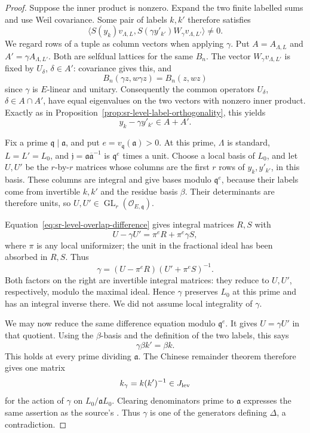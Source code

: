 \begin{proof}
Suppose the inner product is nonzero.
Expand the two finite labelled sums and use Weil covariance.
Some pair of labels \(k,k'\) therefore satisfies
\[
 \langle S(y_k)v_{\Lambda,L},
              S(\gamma y'_{k'})W_\gamma v_{\Lambda,L'}\rangle
                                                        \ne0 .
\]
We regard rows of a tuple as column vectors when applying
\(\gamma\).
Put \(A=A_{\Lambda,L}\) and \(A'=\gamma A_{\Lambda,L'}\).
Both are selfdual lattices for the same \(B_n\).
The vector \(W_\gamma v_{\Lambda,L'}\) is fixed by
\(U_\delta\), \(\delta\in A'\): covariance gives this, and
\[
 B_n(\gamma z,w\gamma z)=B_n(z,wz)
\]
since \(\gamma\) is \(E\)-linear and unitary.
Consequently the common operators \(U_\delta\),
\(\delta\in A\cap A'\), have equal eigenvalues on the two
vectors with nonzero inner product.
Exactly as in
Proposition~\ref{prop:sr-level-label-orthogonality}, this yields
\begin{equation}\label{eq:sr-level-overlap-difference}
              y_k-\gamma y'_{k'}\in A+A'.
\end{equation}

Fix a prime \(\mathfrak q\mid\mathfrak a\), and put
\(e=v_{\mathfrak q}(\mathfrak a)>0\).
At this prime, \(\Lambda\) is standard,
\(L=L'=L_0\), and
\(\mathfrak j=\mathfrak a\overline{\mathfrak a}^{-1}\)
is \(\mathfrak q^e\) times a unit.
Choose a local basis of \(L_0\), and let \(U,U'\) be the
\(r\)-by-\(r\) matrices whose columns are the first \(r\)
rows of \(y_k,y'_{k'}\), in this basis.
These columns are integral and give bases modulo
\(\mathfrak q^e\), because their labels come from invertible
\(k,k'\) and the residue basis \(\beta\).
Their determinants are therefore units, so
\(U,U'\in\operatorname{GL}_r(\mathcal O_{E,\mathfrak q})\).

Equation~\eqref{eq:sr-level-overlap-difference} gives integral
matrices \(R,S\) with
\[
                 U-\gamma U'=\pi^e R+\pi^e\gamma S ,
\]
where \(\pi\) is any local uniformizer; the unit in the
fractional ideal has been absorbed in \(R,S\).
Thus
\[
       \gamma=(U-\pi^eR)(U'+\pi^eS)^{-1}.
\]
Both factors on the right are invertible integral matrices:
they reduce to \(U,U'\), respectively, modulo the maximal
ideal.  Hence \(\gamma\) preserves \(L_0\) at this prime and
has an integral inverse there.
We did not assume local integrality of \(\gamma\).

We may now reduce the same difference equation modulo
\(\mathfrak q^e\).
It gives \(U=\gamma U'\) in that quotient.
Using the \(\beta\)-basis and the definition of the two
labels, this says
\[
                  \gamma\beta k'=\beta k .
\]
This holds at every prime dividing \(\mathfrak a\).
The Chinese remainder theorem therefore gives one matrix
\[
                   k_\gamma=k(k')^{-1}\in J_{\rm lev}
\]
for the action of \(\gamma\) on
\(L_0/\mathfrak aL_0\).
Clearing denominators prime to \(\mathfrak a\) expresses the
same assertion as the source's .
Thus \(\gamma\) is one of the generators defining \(\Delta\),
a contradiction.
\end{proof}

